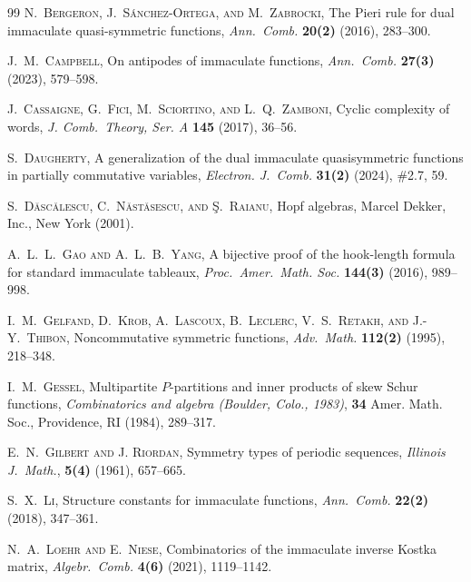 \documentclass{amsart}
\theoremstyle{definition}
\begin{document}
\begin{thebibliography}{99}
 \textsc{N.\ Bergeron, J.\ S\'anchez-Ortega, and M.\ Zabrocki}, 
 The {P}ieri rule for dual immaculate quasi-symmetric functions, 
 \emph{Ann.\ Comb.} {\bf 20(2)} (2016), 283--300. 

 \textsc{J.\ M.\ Campbell}, 
 On antipodes of immaculate functions, 
 \emph{Ann.\ Comb.} {\bf 27(3)} (2023), 579--598. 

 \textsc{J.\ Cassaigne, G.\ Fici, M.\ Sciortino, and L.\ Q.\ Zamboni}, 
 Cyclic complexity of words, 
 \emph{J. Comb.\ Theory, Ser. A} {\bf 145} (2017), 36--56. 

 \textsc{S.\ Daugherty}, 
 A generalization of the dual immaculate quasisymmetric functions in partially commutative variables, 
 \emph{Electron. J.\ Comb.} {\bf 31(2)} (2024), $\#$2.7, 59. 

 \textsc{S.\ D\u asc\u alescu, C.\ N\u ast\u asescu, and \c S.\ Raianu}, 
 Hopf algebras, Marcel Dekker, Inc., New York (2001). 

 \textsc{A.\ L.\ L.\ Gao and A.\ L.\ B.\ Yang}, 
 A bijective proof of the hook-length formula for standard immaculate tableaux, 
 \emph{Proc.\ Amer.\ Math. Soc.} {\bf 144(3)} 
 (2016), 989--998. 

 \textsc{I.\ M.\ Gelfand, D.\ Krob, A.\ Lascoux, B.\ Leclerc, V.\ S.\ Retakh, and J.-Y.\ Thibon}, 
 Noncommutative symmetric functions, 
 \emph{Adv.\ Math.} {\bf 112(2)} 
 (1995), 218--348. 

 \textsc{I.\ M.\ Gessel}, 
 Multipartite {$P$}-partitions and inner products of skew {S}chur functions, 
 \emph{Combinatorics and algebra ({B}oulder, {C}olo., 1983)}, 
 {\bf 34} Amer. Math. Soc., Providence, RI (1984), 289--317. 

 \textsc{E.\ N.\ Gilbert and J. Riordan},
 Symmetry types of periodic sequences,
 \emph{Illinois J.\ Math.},
 {\bf 5(4)} (1961), 657--665.

 \textsc{S.\ X.\ Li}, 
 Structure constants for immaculate functions, 
 \emph{Ann.\ Comb.} {\bf 22(2)} (2018), 347--361. 

 \textsc{N.\ A.\ Loehr and E.\ Niese}, 
 Combinatorics of the immaculate inverse {K}ostka matrix, 
 \emph{Algebr.\ Comb.} {\bf 4(6)} (2021), 1119--1142. 


\end{thebibliography}
\end{document}
